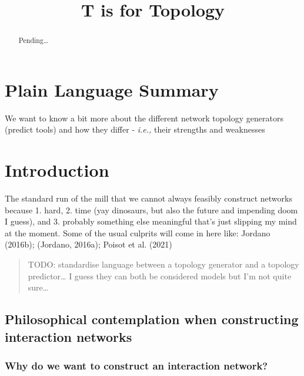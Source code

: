 \documentclass[
]{agujournal2019}
\begin{document}
\title{T is for Topology}



\begin{abstract}
Pending\ldots{}
\end{abstract}

\section*{Plain Language Summary}
We want to know a bit more about the different network topology
generators (predict tools) and how they differ - \emph{i.e.,} their
strengths and weaknesses



\section{Introduction}\label{introduction}

The standard run of the mill that we cannot always feasibly construct
networks because 1. hard, 2. time (yay dinosaurs, but also the future
and impending doom I guess), and 3. probably something else meaningful
that's just slipping my mind at the moment. Some of the usual culprits
will come in here like: Jordano (2016b); (Jordano, 2016a); Poisot et al.
(2021)

\begin{quote}
TODO: standardise language between a topology generator and a topology
predictor\ldots{} I guess they can both be considered models but I'm not
quite sure\ldots{}
\end{quote}

\subsection{Philosophical contemplation when constructing interaction
networks}\label{philosophical-contemplation-when-constructing-interaction-networks}

\subsubsection{Why do we want to construct an interaction
network?}\label{why-do-we-want-to-construct-an-interaction-network}
\end{document}

